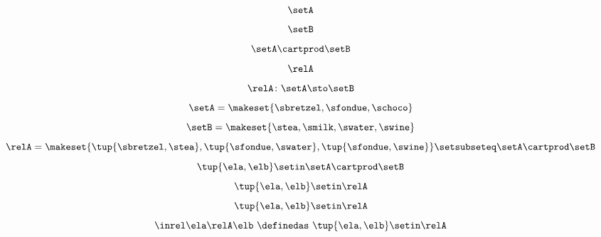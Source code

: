 {\begin{forslides}
        \begin{equation}
            \label{eq:slides_session2_rel_72}
            \setA
        \end{equation}
        \begin{equation}
            \label{eq:slides_session2_rel_73}
            \setB
        \end{equation}
        \begin{equation}
            \label{eq:slides_session2_rel_74}
            \setA \cartprod \setB
        \end{equation}
        \begin{equation}
            \label{eq:slides_session2_rel_75}
            \relA
        \end{equation}
        \begin{equation}
            \label{eq:slides_session2_rel_76}
            \relA \colon \setA \sto \setB
        \end{equation}
        \begin{equation}
            \label{eq:slides_session2_rel_77}
            \setA = \makeset{ \sbretzel, \sfondue, \schoco }
        \end{equation}
        \begin{equation}
            \label{eq:slides_session2_rel_78}
            \setB = \makeset{ \stea, \smilk, \swater, \swine }
        \end{equation}
        \begin{equation}
            \label{eq:slides_session2_rel_79}
            \relA = \makeset{ \tup{\sbretzel, \stea}, \tup{\sfondue, \swater}, \tup{\sfondue, \swine} } \setsubseteq \setA \cartprod \setB
        \end{equation}
        \begin{equation}
            \label{eq:slides_session2_rel_80}
            \tup{\ela,\elb} \setin \setA \cartprod \setB
        \end{equation}
        \begin{equation}
            \label{eq:slides_session2_rel_81}
            \tup{\ela,\elb} \setin \relA
        \end{equation}
        \begin{equation}
            \label{eq:slides_session2_rel_82}
            \tup{\ela,\elb}\setin \relA
        \end{equation}
        \begin{equation}
            \label{eq:slides_session2_rel_83}
            \inrel \ela \relA \elb \ \definedas\  \tup{\ela,\elb}\setin \relA
        \end{equation}


\end{forslides}}

